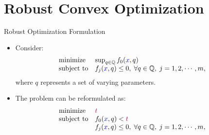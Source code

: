 \documentclass[10pt,ignorenonframetext,serif,onlymath]{beamer}
\begin{document}
\hypertarget{robust-convex-optimization}{%
\section{Robust Convex Optimization}\label{robust-convex-optimization}}

\begin{frame}{Robust Optimization Formulation}
\protect\hypertarget{robust-optimization-formulation}{}

\begin{itemize}
\item
  Consider: \[\begin{array}{ll}
      \text{minimize}   & \sup_{q \in \mathbb Q} f_0({\color{blue}x},q) \\
      \text{subject to} & f_j({\color{blue}x},q) \leq 0, \;
       \forall q \in {\mathbb Q}, \; j = 1,2,\cdots,m,
    \end{array}\] where \(q\) represents a set of varying parameters.
\item
  The problem can be reformulated as: \[\begin{array}{ll}
      \text{minimize}   & {\color{purple}t} \\
      \text{subject to} & f_0({\color{blue}x},q) < {\color{purple}t}  \\
      & f_j({\color{blue}x},q) \leq 0, \;
       \forall q \in {\mathbb Q}, \; j = 1,2,\cdots,m,
    \end{array}\]
\end{itemize}

\end{frame}
\end{document}
